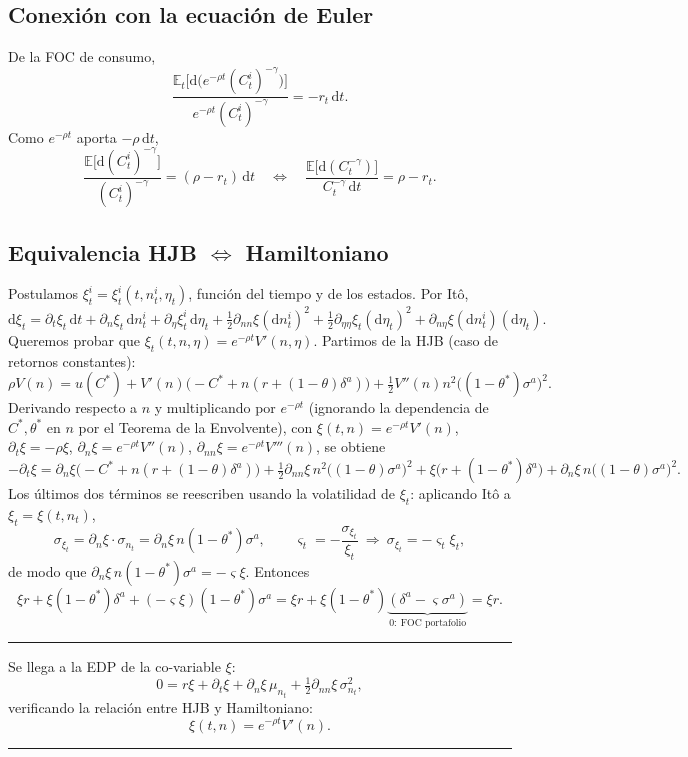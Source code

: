 \documentclass[11pt]{article}
\theoremstyle{definition}
\theoremstyle{remark}
\newenvironment{resultado}
  {\par\medskip\noindent\begin{minipage}{\linewidth}\rule{\linewidth}{0.4pt}\par\smallskip\noindent}
  {\par\smallskip\noindent\rule{\linewidth}{0.4pt}\end{minipage}\medskip\par}
\newcommand{\dd}{\mathrm{d}}
\newcommand{\E}{\mathbb{E}}
\newcommand{\vsig}{\varsigma}
\begin{document}
\subsection{Conexión con la ecuación de Euler}

De la FOC de consumo,
\[
\frac{\E_t\big[\dd\big(e^{-\rho t}(C_t^{i})^{-\gamma}\big)\big]}{e^{-\rho t}(C_t^{i})^{-\gamma}}=-r_t\,\dd t.
\]
Como $e^{-\rho t}$ aporta $-\rho\,\dd t$,
\begin{equation}
\frac{\E\big[\dd(C_t^{i})^{-\gamma}\big]}{(C_t^{i})^{-\gamma}}=(\rho-r_t)\,\dd t
\quad\Longleftrightarrow\quad
\frac{\E\big[\dd(C_t^{-\gamma})\big]}{C_t^{-\gamma}\,\dd t}=\rho-r_t.
\end{equation}

\subsection{Equivalencia HJB $\Leftrightarrow$ Hamiltoniano}

Postulamos $\xi_t^{i}=\xi_t^{i}(t,n_t^{i},\eta_t)$, función del tiempo y de los estados. Por Itô,
\[
\dd\xi_t=\partial_t\xi_t\,\dd t+\partial_n\xi_t\,\dd n_t^{i}+\partial_\eta\xi_t^{i}\,\dd\eta_t
+\tfrac12\partial_{nn}\xi(\dd n_t^{i})^2+\tfrac12\partial_{\eta\eta}\xi_t(\dd\eta_t)^2+\partial_{n\eta}\xi(\dd n_t^{i})(\dd\eta_t).
\]
Queremos probar que $\xi_t(t,n,\eta)=e^{-\rho t}V'(n,\eta)$. Partimos de la HJB (caso de retornos constantes):
\[
\rho V(n)=u(C^*)+V'(n)\big(-C^*+n(r+(1-\theta)\delta^{a})\big)+\tfrac12 V''(n)n^2\big((1-\theta^*)\sigma^{a}\big)^2.
\]
Derivando respecto a $n$ y multiplicando por $e^{-\rho t}$ (ignorando la dependencia de $C^*,\theta^*$ en $n$ por el Teorema de la Envolvente), con $\xi(t,n)=e^{-\rho t}V'(n)$, $\partial_t\xi=-\rho\xi$, $\partial_n\xi=e^{-\rho t}V''(n)$, $\partial_{nn}\xi=e^{-\rho t}V'''(n)$, se obtiene
\[
-\partial_t\xi=\partial_n\xi\big(-C^*+n(r+(1-\theta)\delta^{a})\big)+\tfrac12\partial_{nn}\xi\,n^2\big((1-\theta)\sigma^{a}\big)^2
+\xi\big(r+(1-\theta^*)\delta^{a}\big)+\partial_n\xi\,n\big((1-\theta)\sigma^{a}\big)^2.
\]
Los últimos dos términos se reescriben usando la volatilidad de $\xi_t$: aplicando Itô a $\xi_t=\xi(t,n_t)$,
\[
\sigma_{\xi_t}=\partial_n\xi\cdot\sigma_{n_t}=\partial_n\xi\,n(1-\theta^*)\sigma^{a},
\qquad
\vsig_t=-\frac{\sigma_{\xi_t}}{\xi_t}\ \Rightarrow\ \sigma_{\xi_t}=-\vsig_t\xi_t,
\]
de modo que $\partial_n\xi\,n(1-\theta^*)\sigma^{a}=-\vsig\xi$. Entonces
\[
\xi r+\xi(1-\theta^*)\delta^{a}+(-\vsig\xi)(1-\theta^*)\sigma^{a}
=\xi r+\xi(1-\theta^*)\underbrace{(\delta^{a}-\vsig\sigma^{a})}_{0:\ \text{FOC portafolio}}=\xi r.
\]
\begin{resultado}
Se llega a la EDP de la co-variable $\xi$:
\begin{equation}\label{eq:pde-xi}
0=r\xi+\partial_t\xi+\partial_n\xi\,\mu_{n_t}+\tfrac12\partial_{nn}\xi\,\sigma_{n_t}^2,
\end{equation}
verificando la relación entre HJB y Hamiltoniano:
\begin{equation}
\xi(t,n)=e^{-\rho t}V'(n).
\end{equation}
\end{resultado}
\end{document}

